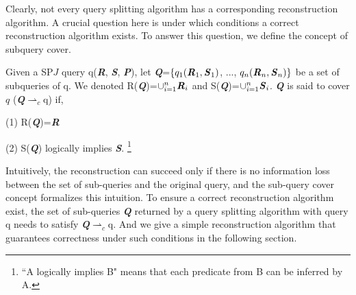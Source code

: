     Clearly, not every query splitting algorithm has a corresponding reconstruction algorithm. A crucial question here is under which conditions a correct reconstruction algorithm exists. To answer this question, we define the concept of subquery cover.
    \begin{Definition} \label{D3}
        Given a SP$J$ query q(\textbf{\textit{R}}, \textbf{\textit{S}}, \textbf{\textit{P}}), let \textbf{\textit{Q}}=$\{q_1(\textbf{\textit{R}}_1,\textbf{\textit{S}}_1)$, ..., $q_n(\textbf{\textit{R}}_n,\textbf{\textit{S}}_n)\}$ be a set of subqueries of q. We denoted R(\textbf{\textit{Q}})=$\cup_{i=1}^n \textbf{\textit{R}}_i$ and S(\textbf{\textit{Q}})=$\cup_{i=1}^n \textbf{\textit{S}}_i$. \textbf{\textit{Q}} is said to cover $q$ (\textbf{\textit{Q}}$\rightharpoonup_c$q) if,\par
        (1) R(\textbf{\textit{Q}})=\textbf{\textit{R}}\par
        (2) S(\textbf{\textit{Q}}) logically implies \textbf{\textit{S}}. \footnote[1]{``A logically implies B" means that each predicate from B can be inferred by A.}
    \end{Definition}\par
    Intuitively, the reconstruction can succeed only if there is no information loss between the set of sub-queries and the original query, and the sub-query cover concept formalizes this intuition. To ensure a correct reconstruction algorithm exist, the set of sub-queries \textbf{\textit{Q}} returned by a query splitting algorithm with query q needs to satisfy \textbf{\textit{Q}}$\rightharpoonup_c$q. And we give a simple reconstruction algorithm that guarantees correctness under such conditions in the following section.

